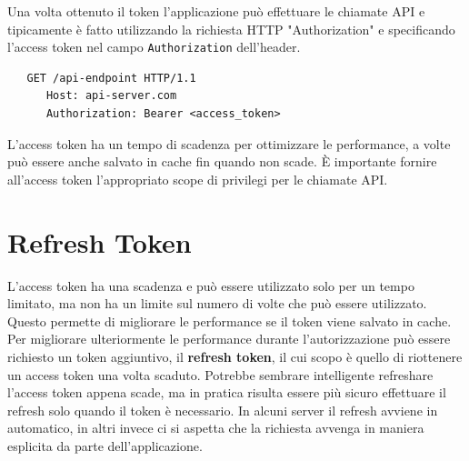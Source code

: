 Una volta ottenuto il token l'applicazione può effettuare le chiamate API e tipicamente
è fatto utilizzando la richiesta HTTP "Authorization" e specificando l'access token
nel campo \verb|Authorization| dell'header.

\begin{lstlisting}
   GET /api-endpoint HTTP/1.1
      Host: api-server.com
      Authorization: Bearer <access_token>
\end{lstlisting}

L'access token ha un tempo di scadenza per ottimizzare le performance, a volte
può essere anche salvato in cache fin quando non scade. È importante fornire
all'access token  l'appropriato scope di privilegi per le chiamate API.

\section{Refresh Token}

L'access token ha una scadenza e può essere utilizzato solo per un tempo limitato,
ma non ha un limite sul numero di volte che può essere utilizzato.
Questo permette di migliorare le performance se il token viene salvato in cache.
Per migliorare ulteriormente le performance durante l'autorizzazione può essere
richiesto un token aggiuntivo, il \textbf{refresh token}, il cui scopo è quello di
riottenere un access token una volta scaduto. Potrebbe sembrare intelligente
refreshare l'access token appena scade, ma in pratica risulta essere più sicuro
effettuare il refresh solo quando il token è necessario.
In alcuni server il refresh avviene in automatico, in altri invece ci si aspetta
che la richiesta avvenga in maniera esplicita da parte dell'applicazione.